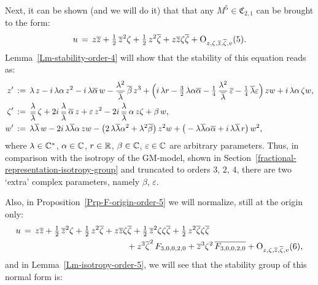 \documentclass[12pt,twoside,leqno,openany]{amsart}
\begin{document}
Next, it can be shown (and we will do it) that that any $M^5 \in 
\mathfrak{C}_{2,1}$ can be brought to the form:
\[
u
\,=\,
z\overline{z}
+
\tfrac{1}{2}\,
\overline{z}^2\zeta
+
\tfrac{1}{2}\,
z^2\overline{\zeta}
+
z\overline{z}\zeta\overline{\zeta}
+
{\rm O}_{z,\zeta,\overline{z},\overline{\zeta},v}(5).
\] 
Lemma~{\ref{Lm-stability-order-4}} will
show that the stability of this equation reads as:
\[
\aligned
z'
&
\,:=\,
\lambda\,z
-
i\,\lambda\alpha\,z^2
-
i\,\lambda\overline{\alpha}\,w
-
\frac{\lambda^2}{\overline{\lambda}}\,
\overline{\beta}\,
z^3
+
\Big(
i\,\lambda r
-
\tfrac{3}{2}\,
\lambda\alpha\overline{\alpha}
-
\tfrac{1}{4}\,
\frac{\lambda^2}{\overline{\lambda}}\,
\overline{\varepsilon}
-
\tfrac{1}{4}\,
\overline{\lambda}\varepsilon
\Big)\,
zw
+
i\,\lambda\alpha\,
\zeta w,
\\
\zeta'
&
\,:=\,
\frac{\lambda}{\overline{\lambda}}\,\zeta
+
2i\,\frac{\lambda}{\overline{\lambda}}\,\overline{\alpha}\,
z
+
\varepsilon\,z^2
-
2i\,\frac{\lambda}{\overline{\lambda}}\,\alpha\,
z\zeta
+
\beta\,w,
\\
w'
&
\,:=\,
\lambda\overline{\lambda}\,w
-
2i\,\lambda\overline{\lambda}\alpha\,
zw
-
\big(
2\,\lambda\overline{\lambda}\alpha^2
+
\lambda^2\overline{\beta}
\big)\,
z^2w
+
\big(
-\lambda\overline{\lambda}\alpha\overline{\alpha}
+
i\,\lambda\overline{\lambda}\,r
\big)\,w^2,
\endaligned
\]
where $\lambda \in \mathbb{C}^\ast$, $\alpha \in \mathbb{C}$, $r \in \mathbb{R}$,
$\beta \in \mathbb{C}$, $\varepsilon \in \mathbb{C}$ are arbitrary
parameters. Thus, in comparison with the isotropy of the GM-model, 
shown in
Section~{\ref{fractional-representation-isotropy-group}} and
truncated to orders $3$, $2$, $4$,
there are two `extra' complex parameters,
namely $\beta$, $\varepsilon$.

Also, in Proposition~{\ref{Prp-F-origin-order-5}}
we will normalize, still at the origin only:
\[
\aligned
u
&
\,=\,
z\overline{z}
+
\tfrac{1}{2}\,\overline{z}^2\zeta
+
\tfrac{1}{2}\,z^2\overline{\zeta}
+
z\overline{z}\zeta\overline{\zeta}
+
\tfrac{1}{2}\,\overline{z}^2\zeta\zeta\overline{\zeta}
+
\tfrac{1}{2}\,z^2\overline{\zeta}\zeta\overline{\zeta}
\notag
\\
&
\ \ \ \ \ \ \ \ \ \ \
\ \ \ \ \ \ \ \ \ \ \ \ \ \ \ \ \ \ \ \ \ \ \ \ \ \
+
z^3\overline{\zeta}^2\,F_{3,0,0,2,0}
+
\overline{z}^3\zeta^2\,\overline{F_{3,0,0,2,0}}
+
{\rm O}_{z,\zeta,\overline{z},\overline{\zeta},v}(6),
\endaligned
\]
and in Lemma~{\ref{Lm-isotropy-order-5}}, we will see that the
stability group of this normal form is:
\end{document}
